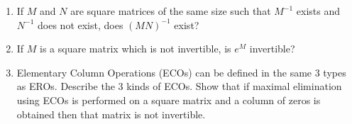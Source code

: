 \begin{enumerate}
\item If $M$ and $N$ are square matrices of the same size such that  $M^{-1}$ exists and $N^{-1}$ does not exist, does $(MN)^{-1}$ exist? 

\item If $M$ is a square matrix which is not invertible, is $e^{M}$ invertible? 

\item Elementary Column Operations  (ECOs) can be defined in the same 3 types as EROs. Describe the 3 kinds of ECOs. Show that if maximal elimination using ECOs is performed on a square matrix and a column of zeros is obtained then that matrix is not invertible. 
















\end{enumerate}
